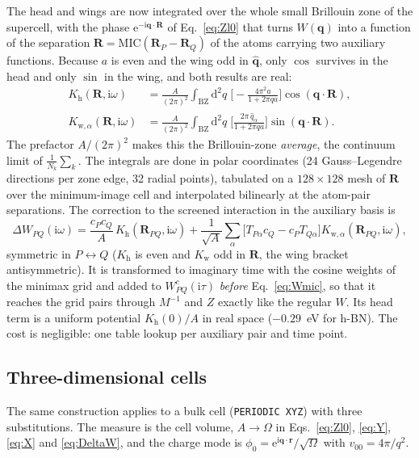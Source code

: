 \documentclass[11pt,a4paper]{article}
\newcommand{\br}{\mathbf{r}}
\newcommand{\bR}{\mathbf{R}}
\newcommand{\bq}{\mathbf{q}}
\newcommand{\qhat}{\hat{\mathbf{q}}}
\newcommand{\dd}{\mathrm{d}}
\newcommand{\ii}{\mathrm{i}}
\newcommand{\ee}{\mathrm{e}}
\newcommand{\MIC}{\mathrm{MIC}}
\newcommand{\head}{\mathrm{h}}
\newcommand{\wing}{\mathrm{w}}
\begin{document}
The head and wings are now integrated over the whole small Brillouin zone of the supercell,
with the phase $\ee^{-\ii\bq\cdot\bR}$ of Eq.~\eqref{eq:Zl0} that turns $W(\bq)$ into a
function of the separation $\bR = \MIC(\bR_P-\bR_Q)$ of the atoms carrying two auxiliary
functions. Because $a$ is even and the wing odd in
$\qhat$, only $\cos$ survives in the head and only $\sin$ in the wing, and both results are
real:
\begin{align}
  K_\head(\bR,\ii\omega) &= \frac{A}{(2\pi)^2}\int_{\mathrm{BZ}}\dd^2 q\;
  \Big[-\frac{4\pi^2 a}{1+2\pi q a}\Big]\cos(\bq\cdot\bR),
  \label{eq:Kh}\\
  K_{\wing,\alpha}(\bR,\ii\omega) &= \frac{A}{(2\pi)^2}\int_{\mathrm{BZ}}\dd^2 q\;
  \Big[\frac{2\pi\,\hat q_\alpha}{1+2\pi q a}\Big]\sin(\bq\cdot\bR).
  \label{eq:Kw}
\end{align}
The prefactor $A/(2\pi)^2$ makes this the Brillouin-zone \emph{average}, the continuum limit of
$\frac1{N_k}\sum_k$. The integrals are done in polar coordinates (24 Gauss--Legendre directions
per zone edge, 32 radial points), tabulated on a $128\times128$ mesh of $\bR$ over the
minimum-image cell and interpolated bilinearly at the atom-pair separations. The correction
to the screened interaction in the auxiliary basis is
\begin{equation}
  \Delta W_{PQ}(\ii\omega) = \frac{c_P c_Q}{A}\,K_\head(\bR_{PQ},\ii\omega)
  + \frac{1}{\sqrt A}\sum_\alpha\big[T_{P\alpha}c_Q - c_P T_{Q\alpha}\big]
  K_{\wing,\alpha}(\bR_{PQ},\ii\omega),
  \label{eq:DeltaW}
\end{equation}
symmetric in $P\leftrightarrow Q$ ($K_\head$ is even and $K_\wing$ odd in $\bR$, the wing
bracket antisymmetric). It is transformed to imaginary time with the cosine weights of the
minimax grid and added to $W^c_{PQ}(\ii\tau)$ \emph{before} Eq.~\eqref{eq:Wmic}, so that it
reaches the grid pairs through $M^{-1}$ and $Z$ exactly like the regular $W$. Its head term
is a uniform potential $K_\head(0)/A$ in real space ($-0.29$~eV for h-BN). The cost is
negligible: one table lookup per auxiliary pair and time point.

\subsection{Three-dimensional cells}
\label{sec:bulk}

The same construction applies to a bulk cell (\texttt{PERIODIC XYZ}) with three substitutions.
The measure is the cell volume, $A\to\Omega$ in Eqs.~\eqref{eq:Zl0}, \eqref{eq:Y}, \eqref{eq:X}
and \eqref{eq:DeltaW}, and the charge mode is $\phi_0 = \ee^{\ii\bq\cdot\br}/\sqrt\Omega$ with
$v_{00} = 4\pi/q^2$.
\end{document}
